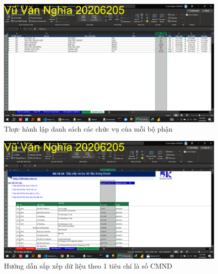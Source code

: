 \documentclass{article}
\begin{document}
\begin{figure}[h]
\centering
\includegraphics[scale = 0.15]{Video1/ThucHanh/6.png}
\caption{Thực hành lập danh sách các chức vụ của mỗi bộ phận}
\end{figure}

\begin{figure}[h]
\centering
\includegraphics[scale = 0.15]{Video2/HuongDan/0.png}
\caption{Hướng dẫn sắp xếp dữ liệu theo 1 tiêu chí là số CMND}
\end{figure}
\end{document}
